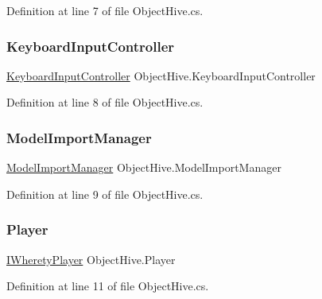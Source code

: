 Definition at line 7 of file Object\+Hive.\+cs.

\mbox{\label{class_object_hive_a8be6d8bd13ee8bd522b428a8c78c9f00}} 
\subsubsection{\texorpdfstring{KeyboardInputController}{KeyboardInputController}}
{\footnotesize\ttfamily \mbox{\hyperlink{class_keyboard_input_controller}{Keyboard\+Input\+Controller}} Object\+Hive.\+Keyboard\+Input\+Controller}



Definition at line 8 of file Object\+Hive.\+cs.

\mbox{\label{class_object_hive_afbf790c375bc8228b66428070789247d}} 
\subsubsection{\texorpdfstring{ModelImportManager}{ModelImportManager}}
{\footnotesize\ttfamily \mbox{\hyperlink{class_model_import_manager}{Model\+Import\+Manager}} Object\+Hive.\+Model\+Import\+Manager}



Definition at line 9 of file Object\+Hive.\+cs.

\mbox{\label{class_object_hive_a933d07cee34249f0111144125b45b54c}} 
\subsubsection{\texorpdfstring{Player}{Player}}
{\footnotesize\ttfamily \mbox{\hyperlink{interface_i_wherety_player}{I\+Wherety\+Player}} Object\+Hive.\+Player}



Definition at line 11 of file Object\+Hive.\+cs.

\mbox{\label{class_object_hive_a10f297a8c8d875b9250799d2a86db441}} 
